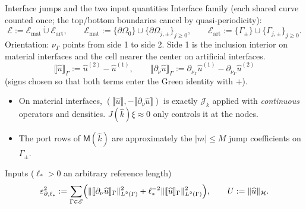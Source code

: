 \documentclass[aspectratio=169]{beamer}
\newcommand{\jump}[1]{\llbracket #1\rrbracket}
\newcommand{\eps}{\varepsilon_{\partial,\ell_*}}
\begin{document}
\begin{frame}{Interface jumps and the two input quantities}
  \footnotesize
  Interface family (each shared curve counted once; the top/bottom boundaries cancel
  by quasi-periodicity):
  \[
    \mathscr E:=\mathscr E_{\mathrm{mat}}\dot\cup\mathscr E_{\mathrm{art}},\qquad
    \mathscr E_{\mathrm{mat}}:=\{\partial\Omega_0\}\cup\{\partial\Omega_{j,\pm}\}_{j\ge0},\qquad
    \mathscr E_{\mathrm{art}}:=\{\Gamma_\pm\}\cup\{\Gamma_{j,\pm}\}_{j\ge0}.
  \]
  Orientation: $\nu_\Gamma$ points from side 1 to side 2. Side 1 is the inclusion
  interior on material interfaces and the cell nearer the center on artificial
  interfaces.
  \[
    \jump{\widehat u}_\Gamma:=\widehat u^{(2)}-\widehat u^{(1)},\qquad
    \jump{\partial_\nu\widehat u}_\Gamma:=\partial_{\nu_\Gamma}\widehat u^{(1)}-\partial_{\nu_\Gamma}\widehat u^{(2)}
  \]
  (signs chosen so that both terms enter the Green identity with $+$).
  \begin{itemize}
    \item On material interfaces, $(\jump{\widehat u},-\jump{\partial_\nu\widehat u})$ is
      exactly $\mathscr J_k$ applied with \emph{continuous} operators and densities.
      $J(\widehat k)\xi\approx0$ only controls it at the nodes.
    \item The port rows of $\mathsf M(\widehat k)$ are approximately the $|m|\le M$ jump
      coefficients on $\Gamma_\pm$.
  \end{itemize}
  \begin{block}{Inputs ($\ell_*>0$ an arbitrary reference length)}
    \[
      \eps^2:=\sum_{\Gamma\in\mathscr E}\Bigl(\lVert\jump{\partial_\nu\widehat u}_\Gamma\rVert_{L^2(\Gamma)}^2
        +\ell_*^{-2}\lVert\jump{\widehat u}_\Gamma\rVert_{L^2(\Gamma)}^2\Bigr),\qquad
      U:=\lVert\widehat u\rVert_{\mathcal H}.
    \]
  \end{block}
\end{frame}
\end{document}
